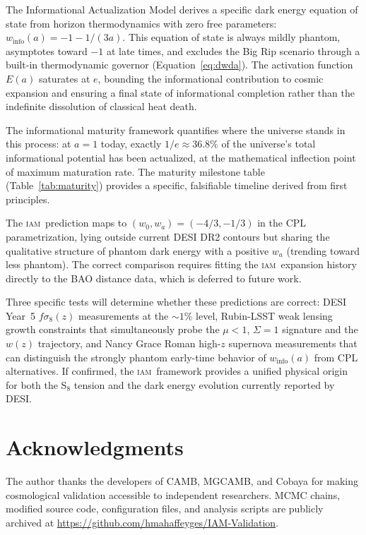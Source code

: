 \documentclass[12pt,letterpaper]{article}
\newcommand{\IAM}{\textsc{iam}}
\newcommand{\Ea}{E(a)}
\newcommand{\winfo}{w_{\mathrm{info}}(a)}
\begin{document}
The Informational Actualization Model derives a specific dark energy equation of state from horizon thermodynamics with zero free parameters: $\winfo = -1 - 1/(3a)$. This equation of state is always mildly phantom, asymptotes toward $-1$ at late times, and excludes the Big Rip scenario through a built-in thermodynamic governor (Equation~\ref{eq:dwda}). The activation function $\Ea$ saturates at $e$, bounding the informational contribution to cosmic expansion and ensuring a final state of informational completion rather than the indefinite dissolution of classical heat death.

The informational maturity framework quantifies where the universe stands in this process: at $a = 1$ today, exactly $1/e \approx 36.8\%$ of the universe's total informational potential has been actualized, at the mathematical inflection point of maximum maturation rate. The maturity milestone table (Table~\ref{tab:maturity}) provides a specific, falsifiable timeline derived from first principles.

The \IAM\ prediction maps to $(w_0, w_a) = (-4/3, -1/3)$ in the CPL parametrization, lying outside current DESI DR2 contours but sharing the qualitative structure of phantom dark energy with a positive $w_a$ (trending toward less phantom). The correct comparison requires fitting the \IAM\ expansion history directly to the BAO distance data, which is deferred to future work.

Three specific tests will determine whether these predictions are correct: DESI Year~5 $f\sigma_8(z)$ measurements at the $\sim 1\%$ level, Rubin-LSST weak lensing growth constraints that simultaneously probe the $\mu < 1$, $\Sigma = 1$ signature and the $w(z)$ trajectory, and Nancy Grace Roman high-$z$ supernova measurements that can distinguish the strongly phantom early-time behavior of $\winfo$ from CPL alternatives. If confirmed, the \IAM\ framework provides a unified physical origin for both the S$_8$ tension and the dark energy evolution currently reported by DESI.

\section*{Acknowledgments}

The author thanks the developers of CAMB, MGCAMB, and Cobaya for making cosmological validation accessible to independent researchers. MCMC chains, modified source code, configuration files, and analysis scripts are publicly archived at \url{https://github.com/hmahaffeyges/IAM-Validation}.
\end{document}
